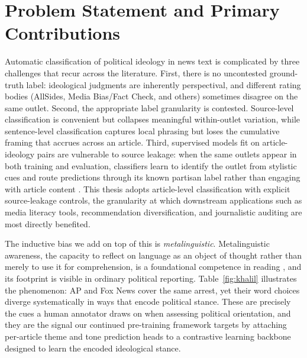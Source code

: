 \section{Problem Statement and Primary Contributions}

Automatic classification of political ideology in news text is complicated by three challenges that recur across the literature. First, there is no uncontested ground-truth label: ideological judgments are inherently perspectival, and different rating bodies (AllSides, Media Bias/Fact Check, and others) sometimes disagree on the same outlet. Second, the appropriate label granularity is contested. Source-level classification \citep{baly2020acl, darwish2020aaai, ronnback2025biasoutlets} is convenient but collapses meaningful within-outlet variation, while sentence-level classification \citep{spinde2021mbic, spinde2021babe, menzner2025biasscanner} captures local phrasing but loses the cumulative framing that accrues across an article. Third, supervised models fit on article-ideology pairs are vulnerable to source leakage: when the same outlets appear in both training and evaluation, classifiers learn to identify the outlet from stylistic cues and route predictions through its known partisan label rather than engaging with article content \citep{baly2020we}. This thesis adopts article-level classification with explicit source-leakage controls, the granularity at which downstream applications such as media literacy tools, recommendation diversification, and journalistic auditing are most directly benefited.

The inductive bias we add on top of this is \emph{metalinguistic}. Metalinguistic awareness, the capacity to reflect on language as an object of thought rather than merely to use it for comprehension, is a foundational competence in reading \citep{tunmer1984development, nagy2007metalinguistic, Zipke10092007}, and its footprint is visible in ordinary political reporting. Table~\ref{fig:khalil} illustrates the phenomenon: AP and Fox News cover the same arrest, yet their word choices diverge systematically in ways that encode political stance. These are precisely the cues a human annotator draws on when assessing political orientation, and they are the signal our continued pre-training framework targets by attaching per-article theme and tone prediction heads to a contrastive learning backbone designed to learn the encoded ideological stance.

